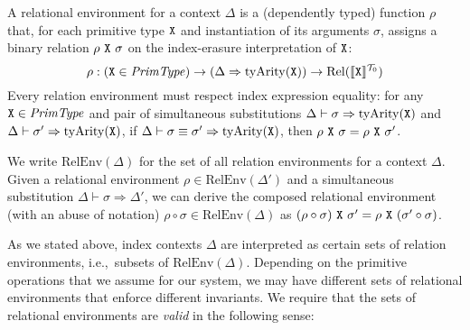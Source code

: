 A relational environment for a context $\Delta$ is a (dependently typed)
function $\rho$ that, for each primitive type $\textup{\texttt{X}}$ and
instantiation of its arguments $\sigma$, assigns a binary relation
$\rho\ \tyPrimNm{X}\ \sigma$ on the index-erasure interpretation of
$\textup{\texttt{X}}$:
\begin{displaymath}
  \rho : (\textup{\texttt{X}} \in \mathit{PrimType}) \to (\Delta \Rightarrow \mathrm{tyArity}(\textup{\texttt{X}})) \to \mathrm{Rel}(\llbracket \textup{\texttt{X}} \rrbracket^{\mathcal{T}_0})
\end{displaymath}
Every relation environment must respect index expression equality: for
any $\textup{\texttt{X}} \in \mathit{PrimType}$ and pair of simultaneous
substitutions $\Delta \vdash \sigma \Rightarrow
\mathrm{tyArity}(\textup{\texttt{X}})$ and $\Delta \vdash \sigma' \Rightarrow
\mathrm{tyArity}(\textup{\texttt{X}})$, if $\Delta \vdash \sigma \equiv \sigma'
\Rightarrow \mathrm{tyArity}(\textup{\texttt{X}})$, then $\rho\ \textup{\texttt{X}}\
\sigma = \rho\ \textup{\texttt{X}}\ \sigma'$.

We write $\mathrm{RelEnv}(\Delta)$ for the set of all relation
environments for a context $\Delta$. Given a relational environment
$\rho \in \mathrm{RelEnv}(\Delta')$ and a simultaneous substitution
$\Delta \vdash \sigma \Rightarrow \Delta'$, we can derive the composed
relational environment (with an abuse of notation) $\rho \circ \sigma
\in \mathrm{RelEnv}(\Delta)$ as $(\rho \circ \sigma)\ \textup{\texttt{X}}\
\sigma' = \rho\ \textup{\texttt{X}}\ (\sigma' \circ \sigma)$.

As we stated above, index contexts $\Delta$ are interpreted as certain
sets of relation environments, i.e.,~subsets of
$\mathrm{RelEnv}(\Delta)$. Depending on the primitive operations that
we assume for our system, we may have different sets of relational
environments that enforce different invariants. We require that the
sets of relational environments are \emph{valid} in the following
sense:

